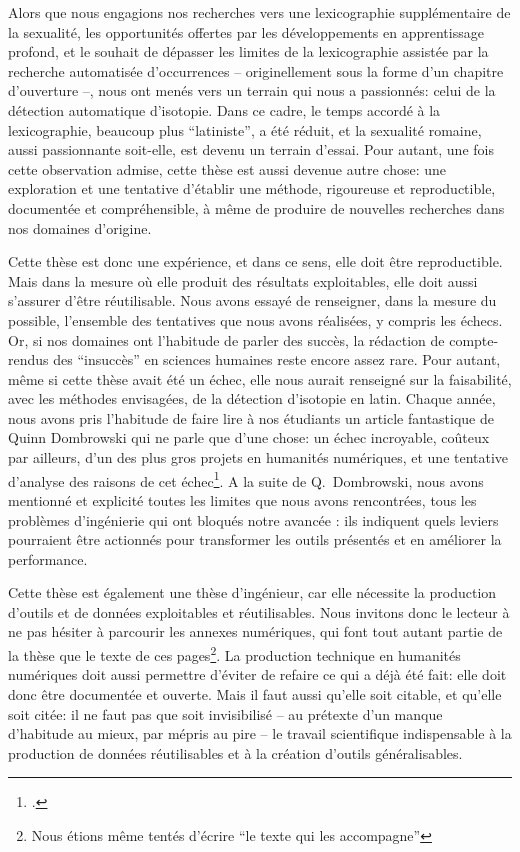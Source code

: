 Alors que nous engagions nos recherches vers une lexicographie supplémentaire de la sexualité, les opportunités offertes par les développements en apprentissage profond, et le souhait de dépasser les limites de la lexicographie assistée par la recherche automatisée d'occurrences -- originellement sous la forme d'un chapitre d'ouverture --, nous ont menés vers un terrain qui nous a passionnés: celui de la détection automatique d'isotopie. Dans ce cadre, le temps accordé à la lexicographie, beaucoup plus \enquote{latiniste}, a été réduit, et la sexualité romaine, aussi passionnante soit-elle, est devenu un terrain d'essai. Pour autant, une fois cette observation admise, cette thèse est aussi devenue autre chose: une exploration et une tentative d'établir une méthode, rigoureuse et reproductible, documentée et compréhensible, à même de produire de nouvelles recherches dans nos domaines d'origine.

Cette thèse est donc une expérience, et dans ce sens, elle doit être reproductible. Mais dans la mesure où elle produit des résultats exploitables, elle doit aussi s'assurer d'être réutilisable. Nous avons essayé de renseigner, dans la mesure du possible, l'ensemble des tentatives que nous avons réalisées, y compris les échecs. Or, si nos domaines ont l'habitude de parler des succès, la rédaction de compte-rendus des \enquote{insuccès} en sciences humaines reste encore assez rare. Pour autant, même si cette thèse avait été un échec, elle nous aurait renseigné sur la faisabilité, avec les méthodes envisagées, de la détection d'isotopie en latin. Chaque année, nous avons pris l'habitude de faire lire à nos étudiants un article fantastique de Quinn Dombrowski qui ne parle que d'une chose: un échec incroyable, coûteux par ailleurs, d'un des plus gros projets en humanités numériques, et une tentative d'analyse des raisons de cet échec\footcite{dombrowski2014ever}. A la suite de Q.~Dombrowski, nous avons mentionné et explicité toutes les limites que nous avons rencontrées, tous les problèmes d'ingénierie qui ont bloqués notre avancée : ils indiquent quels leviers pourraient être actionnés pour transformer les outils présentés et en améliorer la performance.

Cette thèse est également une thèse d'ingénieur, car elle nécessite la production d'outils et de données exploitables et réutilisables. Nous invitons donc le lecteur à ne pas hésiter à parcourir les annexes numériques, qui font tout autant partie de la thèse que le texte de ces pages\footnote{Nous étions même tentés d'écrire \enquote{le texte qui les accompagne}}. La production technique en humanités numériques doit aussi permettre d'éviter de refaire ce qui a déjà été fait: elle doit donc être documentée et ouverte. Mais il faut aussi qu'elle soit citable, et qu'elle soit citée: il ne faut pas que soit invisibilisé -- au prétexte d'un manque d'habitude au mieux, par mépris au pire -- le travail scientifique indispensable à la production de données réutilisables et à la création d'outils généralisables.


